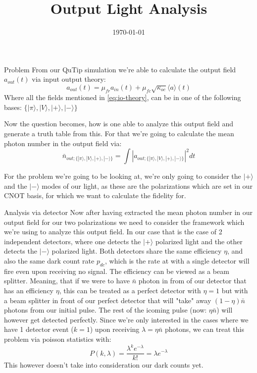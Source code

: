 \documentclass[aspectratio=169]{beamer}
\title{Output Light Analysis}
\subtitle{}
\author{}
\date{\today}
\begin{document}
\frame{\titlepage}

\begin{frame}{Problem}
    From our QuTip simulation we're able to calculate the output field $a_{out}(t)$ via input output theory:
    \begin{equation}
        a_{out}(t) = \mu_{fr}a_{in}(t) + \mu_{fc}\sqrt{\kappa_{oc}}\langle a\rangle(t)
        \label{eq:io-theory}
    \end{equation}
    Where all the fields mentioned in \eqref{eq:io-theory}, can be in one of the following bases: $\{|\pi\rangle,|V\rangle,|+\rangle,|-\rangle \}$

    Now the question becomes, how is one able to analyze this output field and generate a truth table from this. For that we're going to calculate the mean photon number in the output field via:
    $$\bar{n}_{out;\{|\pi\rangle,|V\rangle,|+\rangle,|-\rangle\} } = \int |a_{out;\{ |\pi\rangle,|V\rangle,|+\rangle,|-\rangle  \}}|^2 dt$$

    For the problem we're going to be looking at, we're only going to consider the $|+\rangle$ and the $|-\rangle$ modes of our light, as these are the polarizations which are set in our CNOT basis, for which we want to calculate the fidelity for.
\end{frame}

\begin{frame}{Analysis via detector}
    Now after having extracted the mean photon number in our output field for our two polarizations we need to consider the framework which we're using to analyze this output field. In our case that is the case of 2 independent detectors, where one detects the $|+\rangle$ polarized light and the other detects the $|-\rangle$ polarized light. Both detectors share the same efficiency $\eta$, and also the same dark count rate $p_{dc}$, which is the rate at with a single detector will fire even upon receiving no signal. The efficiency can be viewed as a beam splitter. Meaning, that if we were to have $\bar{n}$ photon in from of our detector that has an efficiency $\eta$, this can be treated as a perfect detector with $\eta=1$ but with a beam splitter in front of our perfect detector that will "take" away $(1-\eta)\bar{n}$ photons from our initial pulse. The rest of the icoming pulse (now: $\eta\bar{n}$) will however get detected perfectly. Since we're only interested in the cases where we have 1 detector event ($k=1$) upon receiving $\lambda=\eta\bar{n}$ photons, we can treat this problem via poisson statistics with:
    $$ P(k,\lambda)=\frac{\lambda^ke^{-\lambda}}{k!} = \lambda e^{-\lambda}$$
    This however doesn't take into consideration our dark counts yet.
\end{frame}
\end{document}
